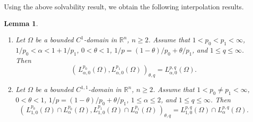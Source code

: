 \documentclass[reqno,centertags,11pt]{amsart}
\newtheorem{lem}[thm]{Lemma}
\theoremstyle{definition}
\numberwithin{thm}{section}
\numberwithin{equation}{section}
\newcommand{\R}{{\mathbb{R}}}
\begin{document}
 Using the above solvability result, we obtain the following interpolation results.

\begin{lem}\label{Interpolatoin of data-solution}
\begin{enumerate}[{\upshape(i)}]
\item  Let $\Omega$ be a bounded $C^1$-domain in $\R^n $, $n\ge 2$. Assume that $1<p_0 < p_1 <\infty$, $1/p_0 <\alpha<1+ 1/p_1$,  $0< \theta < 1$, $1/p=(1-\theta)/p_0 +\theta/p_1$, and $1 \le q \le \infty$.
Then
\[
\left(\,  L_{\alpha,0}^{p_0}(\Omega ) , L_{\alpha,0}^{p_1}(\Omega ) \, \right)_{\theta,q} = L_{\alpha,0}^{p,q}(\Omega ) .
\]
\item Let $\Omega$ be a bounded $C^{1,1}$-domain in $\R^n$, $n\ge 2$.  Assume that $1<p_0 \neq  p_1 <\infty$, $0< \theta < 1$, $1/p=(1-\theta)/p_0 +\theta/p_1$, $1 \le \alpha \le 2$, and $1 \le q \le \infty$.
Then
\[
\left(\, L_{1 ,0}^{p_0}(\Omega ) \cap  L_{\alpha}^{p_0}(\Omega ) , L_{1,0}^{p_1}(\Omega ) \cap L_{\alpha}^{p_1}(\Omega ) \, \right)_{\theta,q} = L_{1,0}^{p,q}(\Omega ) \cap L_{\alpha}^{p,q}(\Omega ).
\]
\end{enumerate}
\end{lem}
\end{document}
